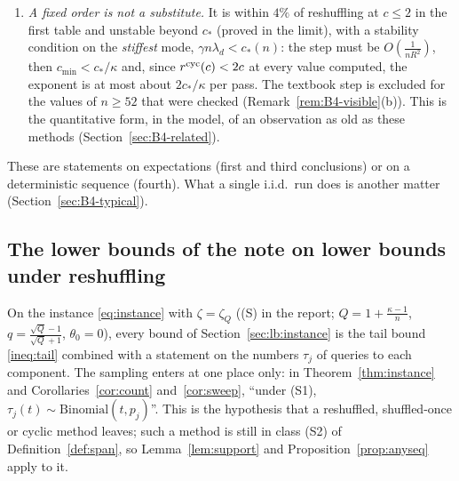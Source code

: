 \begin{enumerate}[label=(\arabic*),nosep]
\item \emph{A fixed order is not a substitute.} It is within $4\%$ of reshuffling at $c\le2$ in the first table and unstable beyond $c_\ast$ (proved in the limit), with a stability condition on the \emph{stiffest} mode, $\gamma n\lambda_d<c_\ast(n)$: the step must be $O(\frac1{nR^2})$, then $c_{\min}<c_\ast/\kappa$ and, since $r^{\rm cyc}(c)<2c$ at every value computed, the exponent is at most about $2c_\ast/\kappa$ per pass. The textbook step is excluded for the values of $n\ge52$ that were checked (Remark~\ref{rem:B4-visible}(b)). This is the quantitative form, in the model, of an observation as old as these methods (Section~\ref{sec:B4-related}).
\end{enumerate}
These are statements on expectations (first and third conclusions) or on a deterministic sequence (fourth). What a single i.i.d.\ run does is another matter (Section~\ref{sec:B4-typical}).

\subsection{The lower bounds of the note on lower bounds under reshuffling}\label{sec:B4-lower}

On the instance \eqref{eq:instance} with $\zeta=\zeta_Q$ ((S) in the report; $Q=1+\frac{\kappa-1}n$, $q=\frac{\sqrt Q-1}{\sqrt Q+1}$, $\theta_0=0$), every bound of Section~\ref{sec:lb:instance} is the tail bound \eqref{ineq:tail} combined with a statement on the numbers $\tau_j$ of queries to each component. The sampling enters at one place only: in Theorem~\ref{thm:instance} and Corollaries~\ref{cor:count} and~\ref{cor:sweep}, ``under (S1), $\tau_j(t)\sim\mathrm{Binomial}(t,p_j)$''. This is the hypothesis that a reshuffled, shuffled-once or cyclic method leaves; such a method is still in class (S2) of Definition~\ref{def:span}, so Lemma~\ref{lem:support} and Proposition~\ref{prop:anyseq} apply to it.

